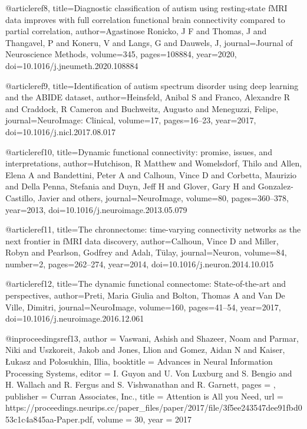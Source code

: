 @article{ref8,
  title={Diagnostic classification of autism using resting-state fMRI data improves with full correlation functional brain connectivity compared to partial correlation},
  author={Agastinose Ronicko, J F and Thomas, J and Thangavel, P and Koneru, V and Langs, G and Dauwels, J},
  journal={Journal of Neuroscience Methods},
  volume={345},
  pages={108884},
  year={2020},
  doi={10.1016/j.jneumeth.2020.108884}
}

@article{ref9,
  title={Identification of autism spectrum disorder using deep learning and the ABIDE dataset},
  author={Heinsfeld, Anibal S and Franco, Alexandre R and Craddock, R Cameron and Buchweitz, Augusto and Meneguzzi, Felipe},
  journal={NeuroImage: Clinical},
  volume={17},
  pages={16--23},
  year={2017},
  doi={10.1016/j.nicl.2017.08.017}
}

@article{ref10,
  title={Dynamic functional connectivity: promise, issues, and interpretations},
  author={Hutchison, R Matthew and Womelsdorf, Thilo and Allen, Elena A and Bandettini, Peter A and Calhoun, Vince D and Corbetta, Maurizio and Della Penna, Stefania and Duyn, Jeff H and Glover, Gary H and Gonzalez-Castillo, Javier and others},
  journal={NeuroImage},
  volume={80},
  pages={360--378},
  year={2013},
  doi={10.1016/j.neuroimage.2013.05.079}
}

@article{ref11,
  title={The chronnectome: time-varying connectivity networks as the next frontier in fMRI data discovery},
  author={Calhoun, Vince D and Miller, Robyn and Pearlson, Godfrey and Adalı, Tülay},
  journal={Neuron},
  volume={84},
  number={2},
  pages={262--274},
  year={2014},
  doi={10.1016/j.neuron.2014.10.015}
}

@article{ref12,
  title={The dynamic functional connectome: State-of-the-art and perspectives},
  author={Preti, Maria Giulia and Bolton, Thomas A and Van De Ville, Dimitri},
  journal={NeuroImage},
  volume={160},
  pages={41--54},
  year={2017},
  doi={10.1016/j.neuroimage.2016.12.061}
}

@inproceedings{ref13,
 author = {Vaswani, Ashish and Shazeer, Noam and Parmar, Niki and Uszkoreit, Jakob and Jones, Llion and Gomez, Aidan N and Kaiser, \L ukasz and Polosukhin, Illia},
 booktitle = {Advances in Neural Information Processing Systems},
 editor = {I. Guyon and U. Von Luxburg and S. Bengio and H. Wallach and R. Fergus and S. Vishwanathan and R. Garnett},
 pages = {},
 publisher = {Curran Associates, Inc.},
 title = {Attention is All you Need},
 url = {https://proceedings.neurips.cc/paper_files/paper/2017/file/3f5ee243547dee91fbd053c1c4a845aa-Paper.pdf},
 volume = {30},
 year = {2017}
}



